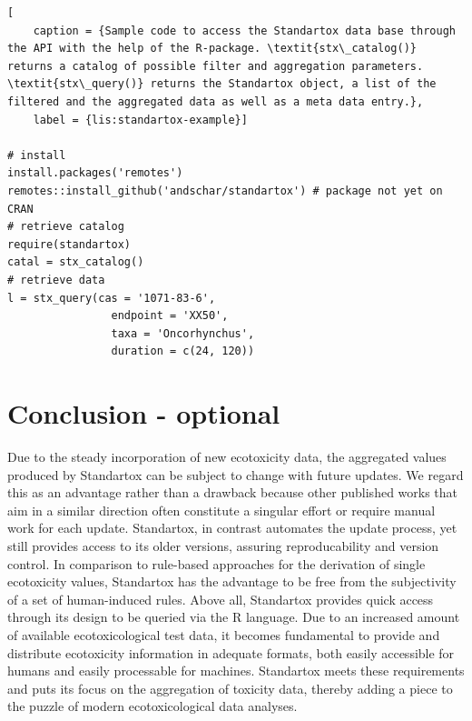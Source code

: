 \documentclass[journal,datadescriptor,accept,moreauthors,pdftex]{Definitions/mdpi}
\begin{document}
\begin{lstlisting}[
    caption = {Sample code to access the Standartox data base through the API with the help of the R-package. \textit{stx\_catalog()} returns a catalog of possible filter and aggregation parameters. \textit{stx\_query()} returns the Standartox object, a list of the filtered and the aggregated data as well as a meta data entry.},
    label = {lis:standartox-example}]
    
# install
install.packages('remotes')
remotes::install_github('andschar/standartox') # package not yet on CRAN
# retrieve catalog    
require(standartox)
catal = stx_catalog()
# retrieve data
l = stx_query(cas = '1071-83-6',
                endpoint = 'XX50',
                taxa = 'Oncorhynchus',
                duration = c(24, 120))
\end{lstlisting}

\section{Conclusion - optional}
Due to the steady incorporation of new ecotoxicity data, the aggregated values produced by Standartox can be subject to change with future updates. We regard this as an advantage rather than a drawback because other published works that aim in a similar direction often constitute a singular effort or require manual work for each update. Standartox, in contrast automates the update process, yet still provides access to its older versions, assuring reproducability and version control. In comparison to rule-based approaches for the derivation of single ecotoxicity values, Standartox has the advantage to be free from the subjectivity of a set of human-induced rules. Above all, Standartox provides quick access through its design to be queried via the R language. Due to an increased amount of available ecotoxicological test data, it becomes fundamental to provide and distribute ecotoxicity information in adequate formats, both easily accessible for humans and easily processable for machines. Standartox meets these requirements and puts its focus on the aggregation of toxicity data, thereby adding a piece to the puzzle of modern ecotoxicological data analyses.


\vspace{6pt} 
\end{document}

